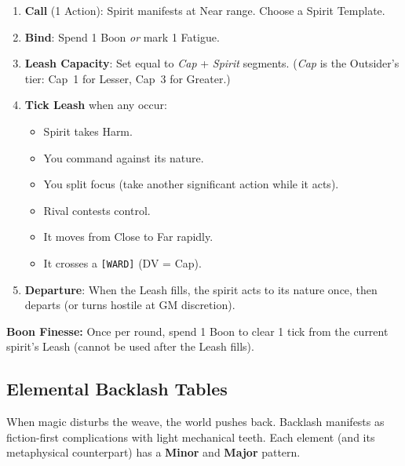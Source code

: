 \begin{enumerate}
    \item \textbf{Call} (1 Action): Spirit manifests at Near range. Choose a Spirit Template.
    \item \textbf{Bind}: Spend 1 Boon \emph{or} mark 1 Fatigue.
    \item \textbf{Leash Capacity}: Set equal to \textit{Cap} + \textit{Spirit} segments. (\textit{Cap} is the Outsider's tier: Cap~1 for Lesser, Cap~3 for Greater.)
    \item \textbf{Tick Leash} when any occur:
        \begin{itemize}
            \item Spirit takes Harm.
            \item You command against its nature.
            \item You split focus (take another significant action while it acts).
            \item Rival contests control.
            \item It moves from Close to Far rapidly.
            \item It crosses a \texttt{[WARD]} (DV = Cap).
        \end{itemize}
    \item \textbf{Departure}: When the Leash fills, the spirit acts to its nature once, then departs (or turns hostile at GM discretion).
\end{enumerate}
\textbf{Boon Finesse:} Once per round, spend 1 Boon to clear 1 tick from the current spirit's Leash (cannot be used after the Leash fills).

\subsection{Elemental Backlash Tables}\label{sec:backlash_tables}

When magic disturbs the weave, the world pushes back. Backlash manifests as fiction-first complications with light mechanical teeth. Each element (and its metaphysical counterpart) has a \textbf{Minor} and \textbf{Major} pattern.

